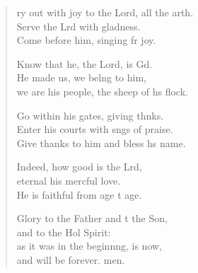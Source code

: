 \begin{verse}
  \begin{patverse}
    ry out with joy to the Lord, all the arth.\Flex\\
Serve the Lrd with gladness.\Med\\
Come before him, singing fr joy.

Know that he, the Lord, is Gd.\Flex\\
He made us, we belng to him,\Med\\
we are his people, the sheep of h\pointup{\i}s flock.

Go within his gates, giving thnks.\Flex\\
Enter his courts with sngs of praise.\Med\\
Give thanks to him and bless h\pointup{\i}s name.

Indeed, how good is the Lrd,\Flex\\
eternal his merc\pointup{\i}ful love.\Med\\
He is faithful from age t age.

Glory to the Father and t the Son,\Med\\
and to the Hol Spirit:\\
as it was in the beginn\pointup{\i}ng, is now,\Med\\
and will be forever. men.
  \end{patverse}
\end{verse}

